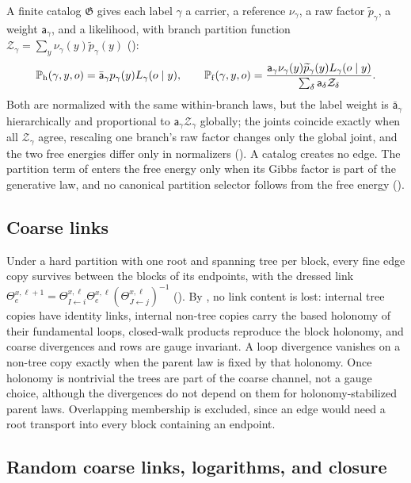 A finite catalog $\mathfrak G$ gives each label $\gamma$ a carrier, a reference $\nu_\gamma$, a raw factor
$\widetilde p_\gamma$, a weight $\mathsf a_\gamma$, and a likelihood, with branch partition function
$\mathcal Z_\gamma=\sum_y\nu_\gamma(y)\widetilde p_\gamma(y)$ ():
\[
\mathbb P_{\mathrm h}(\gamma,y,o)=\bar{\mathsf a}_\gamma p_\gamma(y)L_\gamma(o\mid y),
\qquad
\mathbb P_{\mathrm f}(\gamma,y,o)=\frac{\mathsf a_\gamma\nu_\gamma(y)\widetilde p_\gamma(y)L_\gamma(o\mid y)}{\sum_\delta\mathsf a_\delta\mathcal Z_\delta}.
\]
Both are normalized with the same within-branch laws, but the label weight is $\bar{\mathsf a}_\gamma$
hierarchically and proportional to $\mathsf a_\gamma\mathcal Z_\gamma$ globally; the joints coincide
exactly when all $\mathcal Z_\gamma$ agree, rescaling one branch's raw factor changes only the global
joint, and the two free energies differ only in normalizers (). A catalog
creates no edge. The partition term of  enters the free energy only
when its Gibbs factor is part of the generative law, and no canonical partition selector follows from the
free energy ().

\subsection{Coarse links}

Under a hard partition with one root and spanning tree per block, every fine edge copy survives between
the blocks of its endpoints, with the dressed link
$\Theta^{x,\ell+1}_e=\Theta^{x,\ell}_{I\leftarrow i}\Theta^{x,\ell}_e(\Theta^{x,\ell}_{J\leftarrow j})^{-1}$
(). By , no link content is lost: internal
tree copies have identity links, internal non-tree copies carry the based holonomy of their fundamental
loops, closed-walk products reproduce the block holonomy, and coarse divergences and rows are gauge
invariant. A loop divergence vanishes on a non-tree copy exactly when the parent law is fixed by that
holonomy. Once holonomy is nontrivial the trees are part of the coarse channel, not a gauge choice,
although the divergences do not depend on them for holonomy-stabilized parent laws. Overlapping
membership is excluded, since an edge would need a root transport into every block containing an
endpoint.

\subsection{Random coarse links, logarithms, and closure}
\label{comp:ch12-latent-closure}

